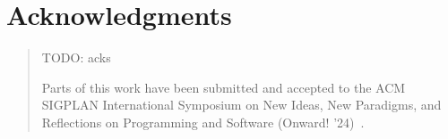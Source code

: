 
\begingroup
\let\raggedsection\centering

\chapter*{Acknowledgments}
\label{cha:acknowledgments}
\endgroup
\begin{quotation}
	\noindent TODO: acks

	\ParSep

	Parts of this work have been submitted and accepted to the ACM SIGPLAN International Symposium on New Ideas, New Paradigms, and Reflections on Programming and Software (Onward! '24)~\cite{thiede2024talking}.
\end{quotation}
